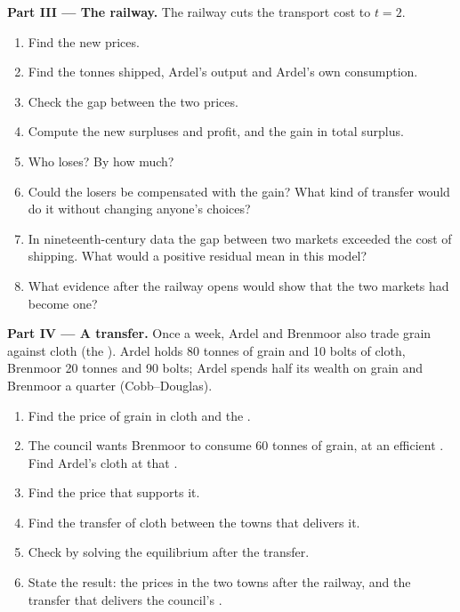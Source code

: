 \begin{problem}
\medskip
\noindent\textbf{Part III --- The railway.} The railway cuts the transport cost to $t = 2$.
\begin{enumerate}[resume]
  \item Find the new prices.
  \item Find the tonnes shipped, Ardel's output and Ardel's own consumption.
  \item Check the gap between the two prices.
  \item Compute the new surpluses and profit, and the gain in total surplus.
  \item Who loses? By how much?
  \item Could the losers be compensated with the gain? What kind of transfer would do it without
        changing anyone's choices?
  \item In nineteenth-century data the gap between two markets exceeded the cost of shipping. What would a
        positive residual mean in this model?
  \item What evidence after the railway opens would show that the two markets had become one?
\end{enumerate}

\medskip
\noindent\textbf{Part IV --- A transfer.} Once a week, Ardel and Brenmoor also trade grain against cloth
(the ). Ardel holds 80 tonnes of grain and 10 bolts of cloth, Brenmoor 20 tonnes and 90 bolts;
Ardel spends half its wealth on grain and Brenmoor a quarter (Cobb--Douglas).
\begin{enumerate}[resume]
  \item Find the  price of grain in cloth and the .
  \item The council wants Brenmoor to consume 60 tonnes of grain, at an efficient . Find
        Ardel's cloth at that .
  \item Find the price that supports it.
  \item Find the transfer of cloth between the towns that delivers it.
  \item Check by solving the equilibrium after the transfer.
  \item State the result: the prices in the two towns after the railway, and the transfer that delivers
        the council's .
\end{enumerate}
\end{problem}
